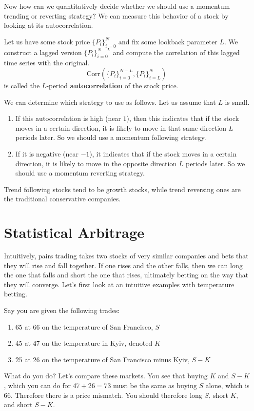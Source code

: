 \documentclass{article}
\begin{document}
    Now how can we quantitatively decide whether we should use a momentum trending or reverting strategy? We can measure this behavior of a stock by looking at its autocorrelation. 

    \begin{definition}[Autocorrelation]
      Let us have some stock price $\{P_i\}_{i=0}^N$ and fix some lookback parameter $L$. We construct a lagged version $\{P_i\}_{i=0}^{N-L}$ and compute the correlation of this lagged time series with the original. 
      \[\mathrm{Corr}(\{P_i\}_{i=0}^{N-L}, \{P_i\}_{i = L}^{N})\]
      is called the $L$-period \textbf{autocorrelation} of the stock price. 
    \end{definition}

    We can determine which strategy to use as follows. Let us assume that $L$ is small.  
    \begin{enumerate}
      \item If this autocorrelation is high (near $1$), then this indicates that if the stock moves in a certain direction, it is likely to move in that same direction $L$ periods later. So we should use a momentum following strategy. 
      \item If it is negative (near $-1$), it indicates that if the stock moves in a certain direction, it is likely to move in the opposite direction $L$ periods later. So we should use a momentum reverting strategy. 
    \end{enumerate}
    Trend following stocks tend to be growth stocks, while trend reversing ones are the traditional conservative companies. 

\section{Statistical Arbitrage}

  Intuitively, pairs trading takes two stocks of very similar companies and bets that they will rise and fall together. If one rises and the other falls, then we can long the one that falls and short the one that rises, ultimately betting on the way that they will converge. Let's first look at an intuitive examples with temperature betting. 

  \begin{example}
    Say you are given the following trades:
    \begin{enumerate}
      \item 65 at 66 on the temperature of San Francisco, $S$
      \item 45 at 47 on the temperature in Kyiv, denoted $K$
      \item 25 at 26 on the temperature of San Francisco minus Kyiv, $S - K$ 
    \end{enumerate}
    What do you do? Let's compare these markets. You see that buying $K$ and $S - K$, which you can do for $47 + 26 = 73$ must be the same as buying $S$ alone, which is $66$. Therefore there is a price mismatch. You should therefore long $S$, short $K$, and short $S - K$. 
  \end{example}
\end{document}
